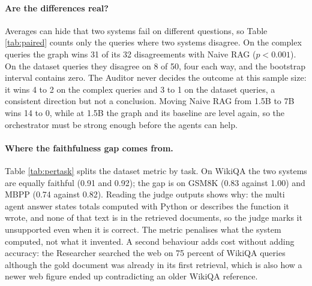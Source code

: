 \documentclass{article}
\begin{document}


\paragraph{Are the differences real?}
Averages can hide that two systems fail on different questions, so Table \ref{tab:paired} counts only the queries where two systems disagree. On the complex queries the graph wins 31 of its 32 disagreements with Naive RAG ($p < 0.001$). On the dataset queries they disagree on 8 of 50, four each way, and the bootstrap interval contains zero. The Auditor never decides the outcome at this sample size: it wins 4 to 2 on the complex queries and 3 to 1 on the dataset queries, a consistent direction but not a conclusion. Moving Naive RAG from 1.5B to 7B wins 14 to 0, while at 1.5B the graph and its baseline are level again, so the orchestrator must be strong enough before the agents can help.



\paragraph{Where the faithfulness gap comes from.}
Table \ref{tab:pertask} splits the dataset metric by task. On WikiQA the two systems are equally faithful (0.91 and 0.92); the gap is on GSM8K (0.83 against 1.00) and MBPP (0.74 against 0.82). Reading the judge outputs shows why: the multi agent answer states totals computed with Python or describes the function it wrote, and none of that text is in the retrieved documents, so the judge marks it unsupported even when it is correct. The metric penalises what the system computed, not what it invented. A second behaviour adds cost without adding accuracy: the Researcher searched the web on 75 percent of WikiQA queries although the gold document was already in its first retrieval, which is also how a newer web figure ended up contradicting an older WikiQA reference.
\end{document}
